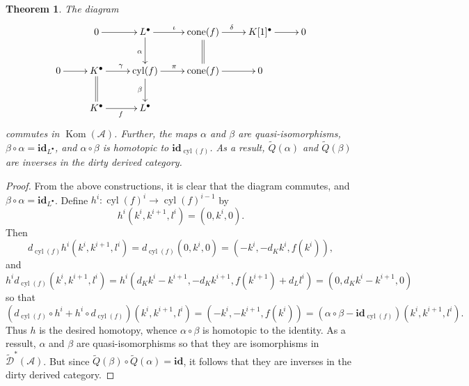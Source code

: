 \documentclass[11pt]{article}
\theoremstyle{thmstyle}
\newtheorem{theorem}{Theorem}[section]
\theoremstyle{defstyle}
\newcommand{\id}{\mathbf{id}}
\newcommand{\scrA}{\mathscr{A}}
\newcommand{\scrD}{\mathscr{D}}
\newcommand{\wt}[1]{\widetilde{#1}}
\newcommand{\Kom}{\operatorname{Kom}}
\newcommand{\cone}{\operatorname{cone}}
\newcommand{\cyl}{\operatorname{cyl}}
\begin{document}
\begin{theorem}
	The diagram 
	\begin{equation*}
		\xymatrix {
			& 0\ar[r] & L^\bullet\ar[r]^\iota\ar[d]_\alpha & \cone(f)\ar[r]^\delta\ar@{=}[d] & K[1]^\bullet\ar[r] & 0\\
			0\ar[r] & K^\bullet\ar[r]^\gamma\ar@{=}[d] & \cyl(f)\ar[r]^\pi\ar[d]_\beta & \cone(f)\ar[r] & 0\\
			& K^\bullet\ar[r]_f & L^\bullet
		}
	\end{equation*}
	commutes in $\Kom(\scrA)$. Further, the maps $\alpha$ and $\beta$ are quasi-isomorphisms, $\beta\circ\alpha = \id_{L^\bullet}$, and $\alpha\circ\beta$ is homotopic to $\id_{\cyl(f)}$. As a result, $\wt Q(\alpha)$ and $\wt Q(\beta)$ are inverses in the dirty derived category.
\end{theorem}
\begin{proof}
	From the above constructions, it is clear that the diagram commutes, and $\beta\circ\alpha = \id_{L^\bullet}$. Define $h^i\colon\cyl(f)^i\to\cyl(f)^{i - 1}$ by 
	\begin{equation*}
		h^i\left(k^i, k^{i + 1}, l^i\right) = \left(0, k^i, 0\right).
	\end{equation*}
	Then 
	\begin{equation*}
		d_{\cyl(f)}h^i\left(k^i, k^{i + 1}, l^i\right) = d_{\cyl(f)}\left(0, k^i, 0\right) =  \left(-k^i, -d_Kk^i, f(k^i)\right),
	\end{equation*}
	and 
	\begin{equation*}
		h^id_{\cyl(f)}\left(k^i, k^{i + 1}, l^i\right) = h^i\left(d_Kk^i - k^{i + 1}, -d_Kk^{i + 1}, f(k^{i + 1}) + d_Ll^i\right) = \left(0, d_Kk^i - k^{i + 1}, 0\right)
	\end{equation*}
	so that 
	\begin{equation*}
		\left(d_{\cyl(f)}\circ h^i + h^i\circ d_{\cyl(f)}\right)\left(k^i, k^{i + 1}, l^i\right) = \left(-k^i, -k^{i + 1}, f(k^i)\right) = \left(\alpha\circ\beta - \id_{\cyl(f)}\right)\left(k^i, k^{i + 1}, l^i\right).
	\end{equation*}
	Thus $h$ is the desired homotopy, whence $\alpha\circ\beta$ is homotopic to the identity. As a ressult, $\alpha$ and $\beta$ are quasi-isomorphisms so that they are isomorphisms in $\wt\scrD^\ast(\scrA)$. But since $\wt Q(\beta)\circ\wt Q(\alpha) = \id$, it follows that they are inverses in the dirty derived category.
\end{proof}
\end{document}
